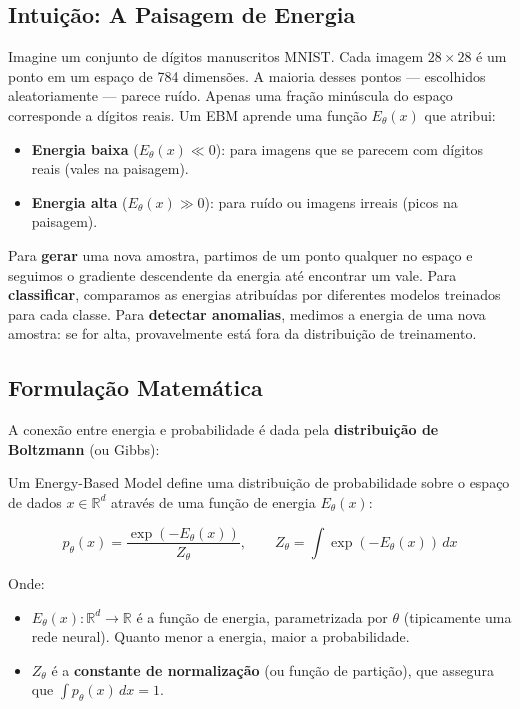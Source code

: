 \documentclass{tufte-handout}
\begin{document}
\subsection{Intuição: A Paisagem de Energia}

Imagine um conjunto de dígitos manuscritos MNIST. Cada imagem $28 \times 28$ é um ponto em um espaço de 784 dimensões. A maioria desses pontos --- escolhidos aleatoriamente --- parece ruído. Apenas uma fração minúscula do espaço corresponde a dígitos reais. Um EBM aprende uma função $E_\theta(x)$ que atribui:

\begin{itemize}
    \item \textbf{Energia baixa} ($E_\theta(x) \ll 0$): para imagens que se parecem com dígitos reais (vales na paisagem).
    \item \textbf{Energia alta} ($E_\theta(x) \gg 0$): para ruído ou imagens irreais (picos na paisagem).
\end{itemize}

Para \textbf{gerar} uma nova amostra, partimos de um ponto qualquer no espaço e seguimos o gradiente descendente da energia até encontrar um vale. Para \textbf{classificar}, comparamos as energias atribuídas por diferentes modelos treinados para cada classe. Para \textbf{detectar anomalias}, medimos a energia de uma nova amostra: se for alta, provavelmente está fora da distribuição de treinamento.

\subsection{Formulação Matemática}

A conexão entre energia e probabilidade é dada pela \textbf{distribuição de Boltzmann} (ou Gibbs):

\begin{thm}
Um Energy-Based Model define uma distribuição de probabilidade sobre o espaço de dados $x \in \mathbb{R}^d$ através de uma função de energia $E_\theta(x)$:

\begin{equation}
p_\theta(x) = \frac{\exp(-E_\theta(x))}{Z_\theta}, \qquad
Z_\theta = \int \exp(-E_\theta(x)) \, dx
\end{equation}
\end{thm}

Onde:
\begin{itemize}
    \item $E_\theta(x): \mathbb{R}^d \rightarrow \mathbb{R}$ é a função de energia, parametrizada por $\theta$ (tipicamente uma rede neural). Quanto menor a energia, maior a probabilidade.
    \item $Z_\theta$ é a \textbf{constante de normalização} (ou função de partição), que assegura que $\int p_\theta(x) \, dx = 1$.
\end{itemize}
\end{document}
